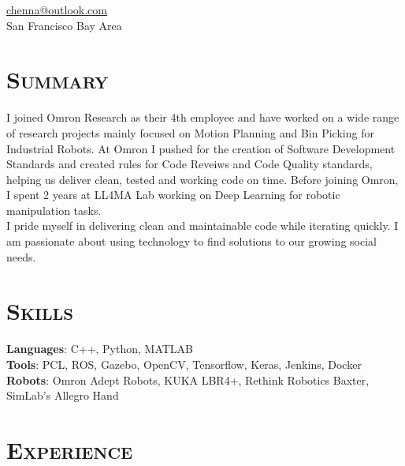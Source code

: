 \documentclass[margin, line]{resume}
\begin{document}
\author{Kautilya Chenna}
{
    \sc
    \hfill \href{mailto:chenna@outlook.com}{chenna@outlook.com}     \vspace{0mm}\\\vspace{0mm}%
    \hfill San Francisco Bay Area                                   \vspace{0mm}\\\vspace{-10.5mm}%
}

\begin{resume}

    \section{\mysidestyle \textsc{Summary}}
    I joined Omron Research as their 4th employee and have worked on a wide
    range of research projects mainly focused on Motion
    Planning and Bin Picking for Industrial Robots. At Omron I pushed for the
    creation of Software Development Standards and created rules for Code Reveiws 
    and Code Quality standards, helping us deliver clean, tested and working code on time.
    Before joining Omron, I spent 2 years at LL4MA Lab
    working on Deep Learning for robotic manipulation tasks.\\[1mm]
    I pride myself in delivering clean and maintainable code while iterating quickly.
    I am passionate about using technology to find solutions to our growing
    social needs.



    \sectionline
    \section{\mysidestyle \textsc{Skills}}

    \textbf{Languages}: C++, Python, MATLAB \\[1mm]
    \textbf{Tools}: PCL, ROS, Gazebo, OpenCV, Tensorflow, Keras, Jenkins, Docker \\[1mm]
    \textbf{Robots}: Omron Adept Robots, KUKA LBR4+, Rethink Robotics Baxter, SimLab's Allegro Hand%



    \sectionline
    \section{\mysidestyle \textsc{Experience}}


\end{resume}
\end{document}
